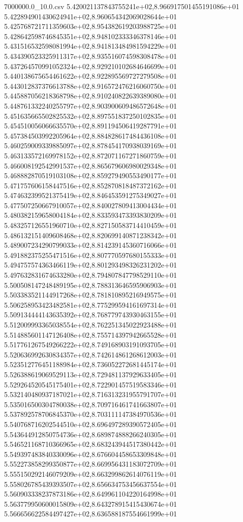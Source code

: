 \begin{filecontents*}{7000000.0_10.0.csv}
5.420021137843755241e+02,8.966917501455191086e+01
5.422894901430624941e+02,8.960654342069028644e+01
5.425768721711359603e+02,8.954382619203988725e+01
5.428642598746845351e+02,8.948102333346378146e+01
5.431516532598081994e+02,8.941813484981594229e+01
5.434390523325911317e+02,8.935516074598308478e+01
5.437264570991052324e+02,8.929210102684646699e+01
5.440138675654461622e+02,8.922895569727279508e+01
5.443012837376613788e+02,8.916572476216060750e+01
5.445887056218368798e+02,8.910240822639389080e+01
5.448761332240255797e+02,8.903900609486572648e+01
5.451635665502825532e+02,8.897551837250102835e+01
5.454510056066635570e+02,8.891194506419287791e+01
5.457384503992205964e+02,8.884828617484436108e+01
5.460259009339885097e+02,8.878454170938039169e+01
5.463133572169978152e+02,8.872071167271860759e+01
5.466008192542991537e+02,8.865679606980029348e+01
5.468882870519103108e+02,8.859279490553490177e+01
5.471757606158447516e+02,8.852870818487372162e+01
5.474632399521375419e+02,8.846453591275349027e+01
5.477507250667910057e+02,8.840027809413004434e+01
5.480382159658004184e+02,8.833593473393830209e+01
5.483257126551960710e+02,8.827150583714410459e+01
5.486132151409608468e+02,8.820699140871238342e+01
5.489007234290799033e+02,8.814239145360716066e+01
5.491882375255471516e+02,8.807770597680155333e+01
5.494757574363466119e+02,8.801293498326231202e+01
5.497632831674633280e+02,8.794807847798529110e+01
5.500508147248489195e+02,8.788313646595906903e+01
5.503383521144917268e+02,8.781810895216949575e+01
5.506258953423482581e+02,8.775299594161697314e+01
5.509134444143635392e+02,8.768779743930463155e+01
5.512009993365038554e+02,8.762251345022923488e+01
5.514885601147126408e+02,8.755714397942665528e+01
5.517761267549266222e+02,8.749168903191093705e+01
5.520636992630834357e+02,8.742614861268612003e+01
5.523512776451188984e+02,8.736052272681445174e+01
5.526388619069529113e+02,8.729481137929633405e+01
5.529264520545175401e+02,8.722901457519583346e+01
5.532140480937187021e+02,8.716313231955791707e+01
5.535016500304780038e+02,8.709716461741663807e+01
5.537892578706845370e+02,8.703111147384970536e+01
5.540768716202544510e+02,8.696497289390572405e+01
5.543644912850754736e+02,8.689874888266240305e+01
5.546521168710366965e+02,8.683243944517380442e+01
5.549397483840330096e+02,8.676604458653309848e+01
5.552273858299350877e+02,8.669956431183072709e+01
5.555150292146079209e+02,8.663299862614076119e+01
5.558026785439393507e+02,8.656634753456637554e+01
5.560903338237873186e+02,8.649961104220164998e+01
5.563779950600015809e+02,8.643278915415430674e+01
5.566656622584497427e+02,8.636588187554661999e+01

\end{filecontents*}
